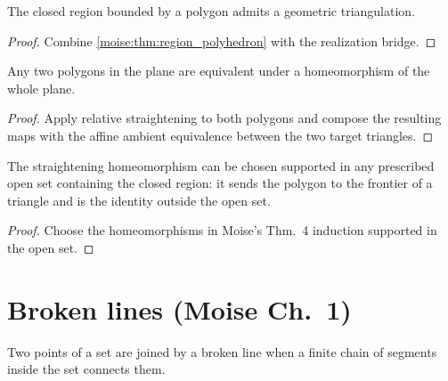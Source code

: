 \begin{lemma}
\label{moise:lem:region_triangulable}
\leanok
{}
The closed region bounded by a polygon admits a geometric triangulation.
\end{lemma}

\begin{proof}
\leanok
Combine \ref{moise:thm:region_polyhedron} with the realization bridge.
\end{proof}

\begin{theorem}
\label{moise:thm:polygonal_schoenflies}
\leanok
{}
Any two polygons in the plane are equivalent under a homeomorphism of the whole
plane.
\end{theorem}

\begin{proof}
\leanok
Apply relative straightening to both polygons and compose the resulting maps
with the affine ambient equivalence between the two target triangles.
\end{proof}

\begin{theorem}
\label{moise:thm:polygonal_schoenflies_rel}
\leanok
{}
The straightening homeomorphism can be chosen supported in any prescribed open
set containing the closed region: it sends the polygon to the frontier of a
triangle and is the identity outside the open set.
\end{theorem}

\begin{proof}
\leanok
Choose the homeomorphisms in Moise's Thm.~4 induction supported in the open
set.
\end{proof}

\section{Broken lines (Moise Ch.~1)}

\begin{definition}
\label{moise:def:broken_line}
\leanok
Two points of a set are joined by a broken line when a finite chain of segments
inside the set connects them.
\end{definition}

